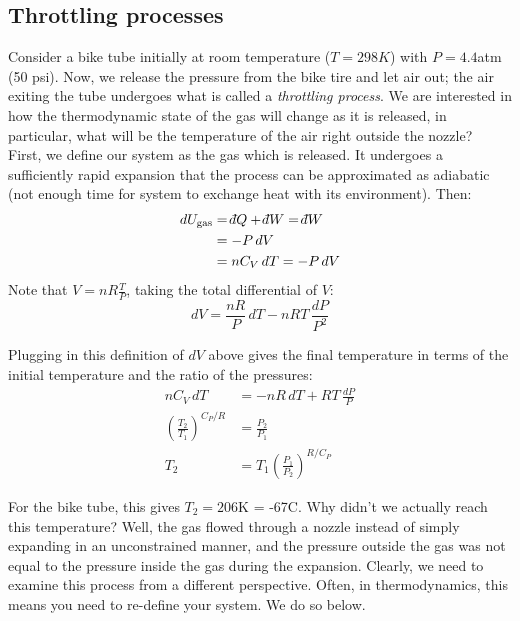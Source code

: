 \documentclass[12pt]{article}
\def\dbar{{\mathchar'26\mkern-12mu d}}
\begin{document}
\subsection{Throttling processes}

 Consider a bike tube initially at room temperature ($T=298K$) with $P=4.4$atm (50 psi).  Now, we release the pressure from the bike tire and let air out; the air exiting the tube undergoes what is called a \emph{throttling process}. We are interested in how the thermodynamic state of the gas will change as it is released, in particular, what will be the temperature of the air right outside the nozzle?\\

First, we define our system as the gas which is released. It undergoes a sufficiently rapid expansion that the process can be approximated as adiabatic (not enough time for system to exchange heat with its environment). Then:
\begin{align*}
dU_\text{gas} &= \dbar Q + \dbar W = \dbar W \\
&= -P \, dV\\
&= n C_V \, dT = -P \, dV
\end{align*}
Note that $V = nR\frac{T}{P}$, taking the total differential of $V$:
$$
dV = \frac{n R}{P} \, dT - nRT \, \frac{dP}{P^2}
$$


Plugging in this definition of $dV$ above gives the final temperature in terms of the initial temperature and the ratio of the pressures:
\begin{align*}
nC_V \, dT &= -nR\, dT + RT \, \frac{dP}{P}\\
\left(\frac{T_2}{T_1}\right)^{C_P/ R} &= \frac{P_2}{P_1}\\
T_2 &= T_1 \left(\frac{P_1}{P_2}\right)^{R/C_P}
\end{align*}

For the bike tube, this gives $T_2 = 206$K = -67\degree C.  Why didn't we actually reach this temperature?  Well, the gas flowed through a nozzle instead of simply expanding in an unconstrained manner, and the pressure outside the gas was not equal to the pressure inside the gas during the expansion. Clearly, we need to examine this process from a different perspective. Often, in thermodynamics, this means you need to re-define your system. We do so below.\\
\end{document}
